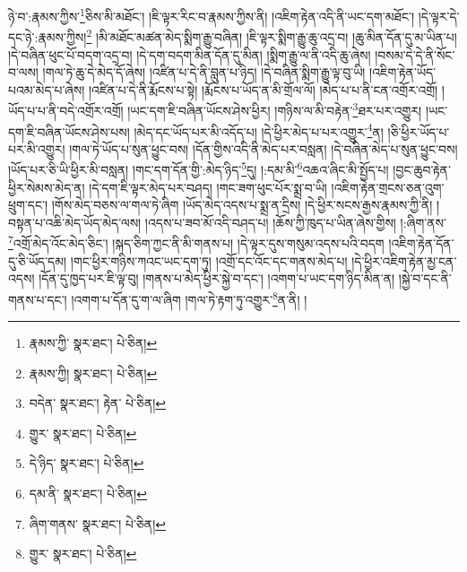 ཉེ་བ་:རྣམས་ཀྱིས་\footnote{རྣམས་ཀྱི་  སྣར་ཐང་།  པེ་ཅིན། }ཅིས་མི་མཐོང་། །ཇི་ལྟར་རིང་བ་རྣམས་ཀྱིས་ནི། །འཇིག་རྟེན་འདི་ནི་ཡང་དག་མཐོང་། །དེ་ལྟར་དེ་དང་ཉེ་:རྣམས་ཀྱིས།\footnote{རྣམས་ཀྱི།  སྣར་ཐང་།  པེ་ཅིན། } །མི་མཐོང་མཚན་མེད་སྨིག་རྒྱུ་བཞིན། །ཇི་ལྟར་སྨིག་རྒྱུ་ཆུ་འདྲ་བ། །ཆུ་མིན་དོན་དུ་མ་ཡིན་པ། །དེ་བཞིན་ཕུང་པོ་བདག་འདྲ་བ། །དེ་དག་བདག་མིན་དོན་དུ་མིན། །སྨིག་རྒྱུ་ལ་ནི་འདི་ཆུ་ཞེས། །བསམ་དེ་དེ་ནི་སོང་བ་ལས། །གལ་ཏེ་ཆུ་དེ་མེད་དོ་ཞེས། །འཛིན་པ་དེ་ནི་བླུན་པ་ཉིད། །དེ་བཞིན་སྨིག་རྒྱུ་ལྟ་བུ་ཡི། །འཇིག་རྟེན་ཡོད་པའམ་མེད་པ་ཞེས། །འཛིན་པ་དེ་ནི་རྨོངས་པ་སྟེ། །རྨོངས་པ་ཡོད་ན་མི་གྲོལ་ལོ། །མེད་པ་པ་ནི་ངན་འགྲོར་འགྲོ། །ཡོད་པ་པ་ནི་བདེ་འགྲོར་འགྲོ། །ཡང་དག་ཇི་བཞིན་ཡོངས་ཤེས་ཕྱིར། །གཉིས་ལ་མི་བརྟེན་\footnote{བདེན་  སྣར་ཐང་། རྟེན་  པེ་ཅིན། }ཐར་པར་འགྱུར། །ཡང་དག་ཇི་བཞིན་ཡོངས་ཤེས་པས། །མེད་དང་ཡོད་པར་མི་འདོད་པ། །དེ་ཕྱིར་མེད་པ་པར་འགྱུར་\footnote{གྱུར་  སྣར་ཐང་།  པེ་ཅིན། }ན། །ཅི་ཕྱིར་ཡོད་པ་པར་མི་འགྱུར། །གལ་ཏེ་ཡོད་པ་སུན་ཕྱུང་བས། །དོན་གྱིས་འདི་ནི་མེད་པར་བསླན། །དེ་བཞིན་མེད་པ་སུན་ཕྱུང་བས། །ཡོད་པར་ཅི་ཡི་ཕྱིར་མི་བསླན། །གང་དག་དོན་གྱི་:མེད་ཉིད་\footnote{དེ་ཉིད་  སྣར་ཐང་།  པེ་ཅིན། }དུ། །:དམ་མི་\footnote{དམ་ནི་  སྣར་ཐང་།  པེ་ཅིན། }འཆའ་ཞིང་མི་སྤྱོད་པ། །བྱང་ཆུབ་རྟེན་ཕྱིར་སེམས་མེད་ན། །དེ་དག་ཇི་ལྟར་མེད་པར་བཤད། །གང་ཟག་ཕུང་པོར་སྨྲ་བ་ཡི། །འཇིག་རྟེན་གྲངས་ཅན་འུག་ཕྲུག་དང་། །གོས་མེད་བཅས་ལ་གལ་ཏེ་ཞིག །ཡོད་མེད་འདས་པ་སྨྲ་ན་དྲིས། །དེ་ཕྱིར་སངས་རྒྱས་རྣམས་ཀྱི་ནི། །བསྟན་པ་འཆི་མེད་ཡོད་མེད་ལས། །འདས་པ་ཟབ་མོ་འདི་བཤད་པ། །ཆོས་ཀྱི་ཁུད་པ་ཡིན་ཞེས་གྱིས། །:ཞིག་ནས་\footnote{ཞིག་གནས་  སྣར་ཐང་།  པེ་ཅིན། }འགྲོ་མེད་འོང་མེད་ཅིང་། །སྐད་ཅིག་ཀྱང་ནི་མི་གནས་པ། །དེ་ལྟར་དུས་གསུམ་འདས་པའི་བདག །འཇིག་རྟེན་དོན་དུ་ཅི་ཡོད་དམ། །གང་ཕྱིར་གཉིས་ཀའང་ཡང་དག་ཏུ། །འགྲོ་དང་འོང་དང་གནས་མེད་པ། །དེ་ཕྱིར་འཇིག་རྟེན་མྱ་ངན་འདས། །དོན་དུ་ཁྱད་པར་ཇི་ལྟ་བུ། །གནས་པ་མེད་ཕྱིར་སྐྱེ་བ་དང་། །འགག་པ་ཡང་དག་ཉིད་མིན་ན། །སྐྱེ་བ་དང་ནི་གནས་པ་དང་། །འགག་པ་དོན་དུ་ག་ལ་ཞིག །གལ་ཏེ་རྟག་ཏུ་འགྱུར་\footnote{གྱུར་  སྣར་ཐང་།  པེ་ཅིན། }ན་ནི། །
